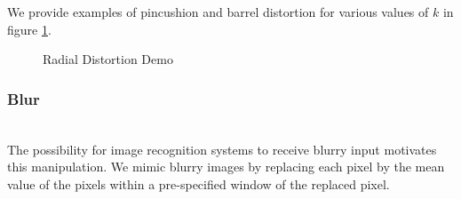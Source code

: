 \documentclass[pageno]{cos429}
\begin{document}
We provide examples of pincushion and barrel distortion for various values of $k$ in figure \ref{fig:manipulationdemo_radial}.

\begin{figure}[!htb]
\caption{Radial Distortion Demo}
\label{fig:manipulationdemo_radial}
\end{figure}

\subsubsection{Blur}\hspace*{\fill} \\
The possibility for image recognition systems to receive blurry input motivates this manipulation. We mimic blurry images by replacing each pixel by the mean value of the pixels within a pre-specified window of the replaced pixel.
\end{document}
